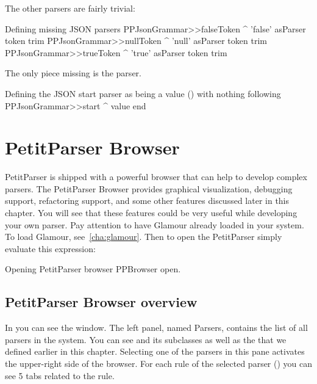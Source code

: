 \documentclass[a4paper,10pt,twoside]{book}
\begin{document}
The other parsers are fairly trivial:

\begin{script}{Defining missing JSON parsers}
PPJsonGrammar>>falseToken
  ^ 'false' asParser token trim
PPJsonGrammar>>nullToken
  ^ 'null' asParser token trim
PPJsonGrammar>>trueToken
  ^ 'true' asParser token trim
\end{script}

The only piece missing is the  parser.

\begin{script}{Defining the JSON start parser as being a value () with nothing following}
PPJsonGrammar>>start
  ^ value end
\end{script}


\section{PetitParser Browser}

PetitParser is shipped with a powerful browser that can help to develop complex parsers.
The PetitParser Browser provides graphical visualization, debugging support, refactoring support, and some other features discussed later in this chapter.
You will see that these features could be very useful while developing your own parser.
Pay attention to have Glamour already loaded in your system. To load Glamour, see~\ref{cha:glamour}. Then to open the PetitParser simply evaluate this expression:
\begin{script}{Opening PetitParser browser}
PPBrowser open.
\end{script}

\subsection{PetitParser Browser overview}

In  you can see the  window.
The left panel, named Parsers, contains the list of all parsers in the system.
You can see  and its subclasses as well as the  that we defined earlier in this chapter.
Selecting one of the parsers in this pane activates the upper-right side of the browser.
For each rule of the selected parser (\eg {}) you can see 5 tabs related to the rule.
\end{document}

